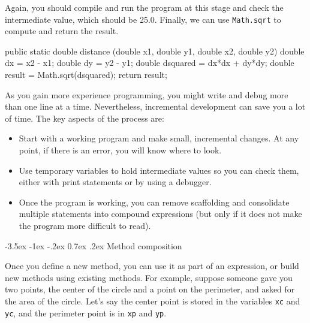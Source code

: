 \documentclass[12pt]{book}
\makeatletter
\theoremstyle{exercise}
\newcommand{\java}[1]{\verb"#1"}
\renewcommand{\section}{\@startsection {section}{1}{\z@}%
    {-3.5ex \@plus -1ex \@minus -.2ex}%
    {0.7ex \@plus.2ex}%
    {\normalfont\Large\bfseries}}
\newcommand{\java}[1]{\lstinline{#1}} %
\makeatother
\begin{document}
Again, you should compile and run the program at this stage and check the intermediate value, which should be 25.0.
Finally, we can use \java{Math.sqrt} to compute and return the result.

\begin{code}
    public static double distance
            (double x1, double y1, double x2, double y2) {
        double dx = x2 - x1;
        double dy = y2 - y1;
        double dsquared = dx*dx + dy*dy;
        double result = Math.sqrt(dsquared);
        return result;
    }
\end{code}


As you gain more experience programming, you might write and debug more than one line at a time.
Nevertheless, incremental development can save you a lot of time.
The key aspects of the process are:

\begin{itemize}

\item Start with a working program and make small, incremental changes.
At any point, if there is an error, you will know where to look.

\item Use temporary variables to hold intermediate values so you can check them, either with print statements or by using a debugger.

\item Once the program is working, you can remove scaffolding and consolidate multiple statements into compound expressions (but only if it does not make the program more difficult to read).

\end{itemize}


\section{Method composition}


Once you define a new method, you can use it as part of an expression, or build new methods using existing methods.
For example, suppose someone gave you two points, the center of the circle and a point on the perimeter, and asked for the area of the circle.
Let's say the center point is stored in the variables \java{xc} and \java{yc}, and the perimeter point is in \java{xp} and \java{yp}.
\end{document}
